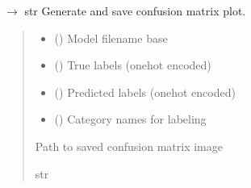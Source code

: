 \documentclass[letterpaper,10pt,english]{sphinxmanual}
\begin{document}
\begin{fulllineitems}
\label{\detokenize{autoapi/src/RNNTrainer/index:src.RNNTrainer.confusion_matrix}}
\pysigstartsignatures
\pysiglinewithargsret
{}
{\sphinxparamcomma {}\sphinxparamcomma {}\sphinxparamcomma {}}
{{ $\rightarrow$ str}}
\pysigstopsignatures
\sphinxAtStartPar
Generate and save confusion matrix plot.
\begin{quote}\begin{description}
\begin{itemize}
\item {} 
\sphinxAtStartPar
{} () \textendash{} Model filename base

\item {} 
\sphinxAtStartPar
{} () \textendash{} True labels (one\sphinxhyphen{}hot encoded)

\item {} 
\sphinxAtStartPar
{} () \textendash{} Predicted labels (one\sphinxhyphen{}hot encoded)

\item {} 
\sphinxAtStartPar
{} (\sphinxstyleliteralemphasis{\sphinxupquote{{[}}}\sphinxstyleliteralemphasis{\sphinxupquote{{]}}}) \textendash{} Category names for labeling

\end{itemize}

\sphinxAtStartPar
Path to saved confusion matrix image

\sphinxAtStartPar
str

\end{description}\end{quote}

\end{fulllineitems}
\end{document}
